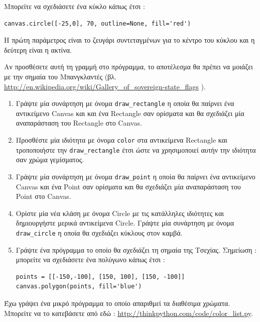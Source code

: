 \documentclass[10pt]{book}
\begin{document}
\begin{exercise}
Μπορείτε να σχεδιάσετε ένα κύκλο κάπως έτσι : 

\begin{verbatim}
canvas.circle([-25,0], 70, outline=None, fill='red')
\end{verbatim}

 Η πρώτη παράμετρος είναι το ζευγάρι συντεταγμένων για το κέντρο του κύκλου και η δεύτερη είναι η ακτίνα.  

Αν προσθέσετε αυτή τη γραμμή στο πρόγραμμα, το αποτέλεσμα θα πρέπει να μοιάζει με την σημαία του Μπανγκλαντές 
(βλ.  \url{http://en.wikipedia.org/wiki/Gallery_of_sovereign-state_flags} ).


\begin{enumerate}

\item Γράψτε μία συνάρτηση με όνομα  \verb"draw_rectangle"  η οποία θα παίρνει ένα αντικείμενο  Canvas  και 
  και ένα  Rectangle  σαν ορίσματα και θα σχεδιάζει μία αναπαράσταση του  Rectangle  στο  Canvas. 
   
\item Προσθέστε μία ιδιότητα με όνομα  {\tt color}  στα αντικείμενα  Rectangle  και τροποποιήστε την  
  \verb"draw_rectangle"  έτσι ώστε να χρησιμοποιεί αυτήν την ιδιότητα σαν χρώμα γεμίσματος.
  
\item Γράψτε μία συνάρτηση με όνομα  \verb"draw_point"  η οποία θα παίρνει ένα αντικείμενο  Canvas  και ένα 
    Point  σαν ορίσματα και θα σχεδιάζει μία αναπαράσταση του  Point  στο  Canvas.  

\item Ορίστε μία νέα κλάση με όνομα  Circle  με τις κατάλληλες ιδιότητες και δημιουργήστε μερικά αντικείμενα  Circle.   
  Γράψτε μία συνάρτηση με όνομα  \verb"draw_circle"  η οποία θα σχεδιάζει κύκλους στον καμβά.

\item Γράψτε ένα πρόγραμμα το οποίο θα σχεδιάζει τη σημαία της Τσεχίας.  
  Σημείωση :  μπορείτε να σχεδιάσετε ένα πολύγωνο κάπως έτσι :

\begin{verbatim}
points = [[-150,-100], [150, 100], [150, -100]]
canvas.polygon(points, fill='blue')
\end{verbatim}

\end{enumerate}

 Έχω γράψει ένα μικρό πρόγραμμα το οποίο απαριθμεί τα διαθέσιμα χρώματα.  Μπορείτε να το κατεβάσετε από εδώ : 
\url{http://thinkpython.com/code/color_list.py}. 

\end{exercise}
\end{document}
